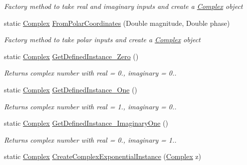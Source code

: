 \begin{DoxyCompactItemize}
\begin{DoxyCompactList}\small\item\em Factory method to take real and imaginary inputs and create a \mbox{\hyperlink{struct_c_s_i_1_1_library_1_1_data_types_1_1_complex}{Complex}} object \end{DoxyCompactList}\item 
static \mbox{\hyperlink{struct_c_s_i_1_1_library_1_1_data_types_1_1_complex}{Complex}} \mbox{\hyperlink{struct_c_s_i_1_1_library_1_1_data_types_1_1_complex_aa39afe9b672a721837776ae09c85188f}{From\+Polar\+Coordinates}} (Double magnitude, Double phase)
\begin{DoxyCompactList}\small\item\em Factory method to take polar inputs and create a \mbox{\hyperlink{struct_c_s_i_1_1_library_1_1_data_types_1_1_complex}{Complex}} object \end{DoxyCompactList}\item 
static \mbox{\hyperlink{struct_c_s_i_1_1_library_1_1_data_types_1_1_complex}{Complex}} \mbox{\hyperlink{struct_c_s_i_1_1_library_1_1_data_types_1_1_complex_a16b834dafff811021ea734ebe877343b}{Get\+Defined\+Instance\+\_\+\+Zero}} ()
\begin{DoxyCompactList}\small\item\em Returns complex number with real = 0., imaginary = 0.. \end{DoxyCompactList}\item 
static \mbox{\hyperlink{struct_c_s_i_1_1_library_1_1_data_types_1_1_complex}{Complex}} \mbox{\hyperlink{struct_c_s_i_1_1_library_1_1_data_types_1_1_complex_adfc9b143806ae8ce3e2dacb1c62ab458}{Get\+Defined\+Instance\+\_\+\+One}} ()
\begin{DoxyCompactList}\small\item\em Returns complex number with real = 1., imaginary = 0.. \end{DoxyCompactList}\item 
static \mbox{\hyperlink{struct_c_s_i_1_1_library_1_1_data_types_1_1_complex}{Complex}} \mbox{\hyperlink{struct_c_s_i_1_1_library_1_1_data_types_1_1_complex_a9e878f7f5867e6f513d57537cdf4dd55}{Get\+Defined\+Instance\+\_\+\+Imaginary\+One}} ()
\begin{DoxyCompactList}\small\item\em Returns complex number with real = 0., imaginary = 1.. \end{DoxyCompactList}\item 
static \mbox{\hyperlink{struct_c_s_i_1_1_library_1_1_data_types_1_1_complex}{Complex}} \mbox{\hyperlink{struct_c_s_i_1_1_library_1_1_data_types_1_1_complex_ae3596863bdda93658c3b4162d6ad0fd6}{Create\+Complex\+Exponential\+Instance}} (\mbox{\hyperlink{struct_c_s_i_1_1_library_1_1_data_types_1_1_complex}{Complex}} z)

\end{DoxyCompactItemize}
